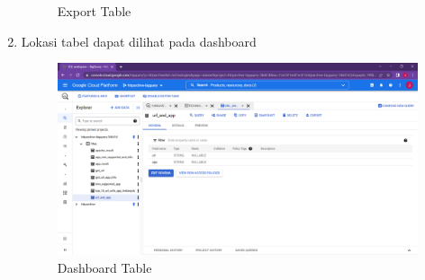 \begin{enumerate}
\begin{figure}[H]
		\caption{Export Table} 
		\label{fig:export_table}
	\end{figure}
	\item Lokasi tabel dapat dilihat pada dashboard
		\begin{figure}[H]
		\centering  
		\includegraphics[scale=0.35]{Gambar/saved dashboard.PNG}  
		\caption{Dashboard Table} 
		\label{fig:export_table}
	\end{figure}
\end{enumerate}

